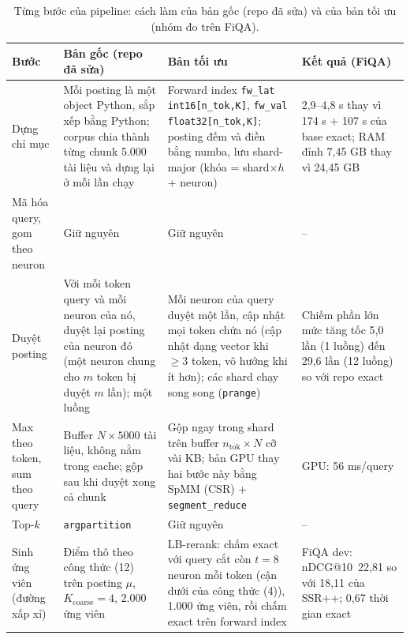 \documentclass[a4paper,13pt]{extreport}
\makeatletter
\theoremstyle{plain}
\newcommand{\ssrpp}{SSR++}
\newcommand{\ndcg}{nDCG@10}
\makeatother
\begin{document}
\begin{table}[htbp]
\centering
\caption{Từng bước của pipeline: cách làm của bản gốc (repo đã sửa) và của bản tối ưu (nhóm đo trên FiQA).}
\label{tab:optmap}
\footnotesize
\begin{tabular}{P{2.5cm}P{4.6cm}P{4.6cm}P{2.6cm}}
\toprule
\textbf{Bước} & \textbf{Bản gốc (repo đã sửa)} & \textbf{Bản tối ưu} & \textbf{Kết quả (FiQA)}\\
\midrule
Dựng chỉ mục & Mỗi posting là một object Python, sắp xếp bằng Python; corpus chia thành từng chunk 5.000 tài liệu và dựng lại ở mỗi lần chạy & Forward index \texttt{fw\_lat int16[n\_tok,K]}, \texttt{fw\_val float32[n\_tok,K]}; posting đếm và điền bằng numba, lưu shard-major (khóa = shard$\times h$ + neuron) & 2,9--4,8 s thay vì 174 s + 107 s của base exact; RAM đỉnh 7,45 GB thay vì 24,45 GB\\
Mã hóa query, gom theo neuron & Giữ nguyên & Giữ nguyên & --\\
Duyệt posting & Với mỗi token query và mỗi neuron của nó, duyệt lại posting của neuron đó (một neuron chung cho $m$ token bị duyệt $m$ lần); một luồng & Mỗi neuron của query duyệt một lần, cập nhật mọi token chứa nó (cập nhật dạng vector khi $\ge 3$ token, vô hướng khi ít hơn); các shard chạy song song (\texttt{prange}) & Chiếm phần lớn mức tăng tốc 5,0 lần (1 luồng) đến 29,6 lần (12 luồng) so với repo exact\\
Max theo token, sum theo query & Buffer $N\times 5000$ tài liệu, không nằm trong cache; gộp sau khi duyệt xong cả chunk & Gộp ngay trong shard trên buffer $n_{\text{tok}}\times N$ cỡ vài KB; bản GPU thay hai bước này bằng SpMM (CSR) + \texttt{segment\_reduce} & GPU: 56 ms/query\\
Top-$k$ & \texttt{argpartition} & Giữ nguyên & --\\
Sinh ứng viên (đường xấp xỉ) & Điểm thô theo công thức (12) trên posting $\mu$, $K_{\text{coarse}}=4$, 2.000 ứng viên & LB-rerank: chấm exact với query cắt còn $t=8$ neuron mỗi token (cận dưới của công thức (4)), 1.000 ứng viên, rồi chấm exact trên forward index & FiQA dev: \ndcg\ 22,81 so với 18,11 của \ssrpp; 0,67 thời gian exact\\
\bottomrule
\end{tabular}
\end{table}
\end{document}
